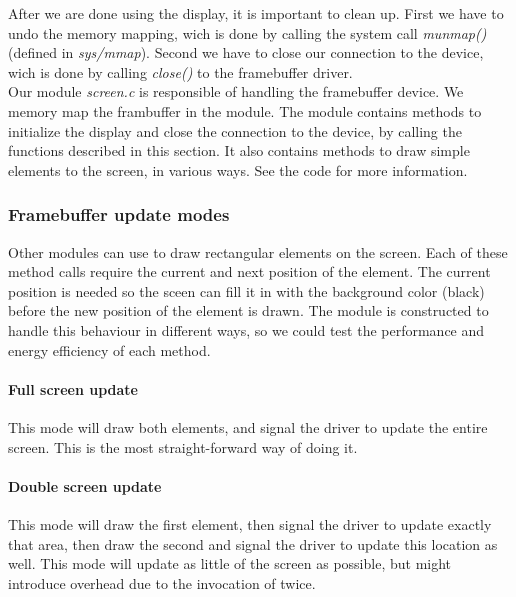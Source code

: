 After we are done using the display, it is important to clean up. First we have to undo the memory mapping, wich is done by calling the system call \emph{munmap()} (defined in \emph{sys/mmap}). Second we have to close our connection to the device, wich is done by calling \emph{close()} to the framebuffer driver. \\

Our module \emph{screen.c} is responsible of handling the framebuffer device. We memory map the frambuffer in the module. The module contains methods to initialize the display and close the connection to the device, by calling the functions described in this section. It also contains methods to draw simple elements to the screen, in various ways. See the code for more information. 

\subsubsection{Framebuffer update modes}
\label{subsubsection:framebuffer-update-modes}
Other modules can use  to draw rectangular elements on the screen. Each of these method calls require the current and next position of the element. The current position is needed so the sceen can fill it in with the background color (black) before the new position of the element is drawn. The module is constructed to handle this behaviour in different ways, so we could test the performance and energy efficiency of each method.

\paragraph{Full screen update}
This mode will draw both elements, and signal the driver to update the entire screen. This is the most straight-forward way of doing it.

\paragraph{Double screen update}
This mode will draw the first element, then signal the driver to update exactly that area, then draw the second and signal the driver to update this location as well. This mode will update as little of the screen as possible, but might introduce overhead due to the invocation of  twice.

